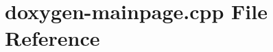 \hypertarget{doxygen-mainpage_8cpp}{}\section{doxygen-\/mainpage.cpp File Reference}
\label{doxygen-mainpage_8cpp}
